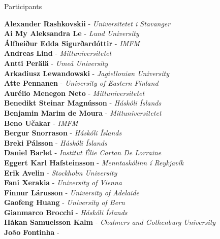 \documentclass[12pt, openany]{report}      %
\begin{document}



\pagebreak



\pagebreak





\newpage
{}

\noindent
{\LARGE Participants}

\bigskip
\bigskip
\noindent
\textbf{Alexander Rashkovskii} -
\textit{Universitetet i Stavanger}
\\
\textbf{Ai My Aleksandra Le} -
\textit{Lund University}
\\
\textbf{Álfheiður Edda Sigurðardóttir} -
\textit{IMFM}
\\
\textbf{Andreas Lind} -
\textit{Mittuniversitetet}
\\
\textbf{Antti Perälä} -
\textit{Umeå University}
\\
\textbf{Arkadiusz Lewandowski} -
\textit{Jagiellonian University}
\\
\textbf{Atte Pennanen} -
\textit{University of Eastern Finland}
\\
\textbf{Aurélio Menegon Neto} -
\textit{Mittuniversitetet}
\\
\textbf{Benedikt Steinar Magnússon} -
\textit{Háskóli Íslands}
\\
\textbf{Benjamin Marim de Moura} -
\textit{Mittuniversitetet}
\\
\textbf{Beno Učakar} -
\textit{IMFM}
\\
\textbf{Bergur Snorrason} -
\textit{Háskóli Íslands}
\\
\textbf{Breki Pálsson} -
\textit{Háskóli Íslands}
\\
\textbf{Daniel Barlet} -
\textit{Institut Élie Cartan De Lorraine}
\\
\textbf{Eggert Karl Hafsteinsson} -
\textit{Menntaskólinn í Reykjavík}
\\
\textbf{Erik Avelin} -
\textit{Stockholm University}
\\
\textbf{Fani Xerakia} -
\textit{University of Vienna}
\\
\textbf{Finnur Lárusson} -
\textit{University of Adelaide}
\\
\textbf{Gaofeng Huang} -
\textit{University of Bern}
\\
\textbf{Gianmarco Brocchi} -
\textit{Háskóli Íslands}
\\
\textbf{Håkan Samuelsson Kalm} -
\textit{Chalmers and Gothenburg University}
\\
\textbf{João Fontinha} -
\end{document}
